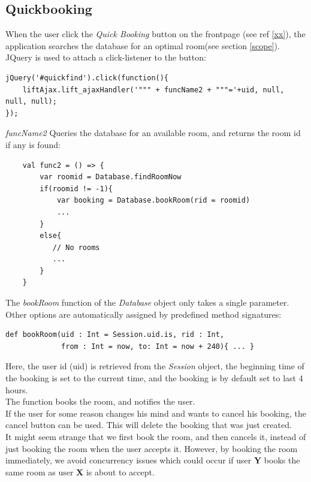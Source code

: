\subsection{Quickbooking}
\label{sub:quickbooking}
When the user click the \emph{Quick Booking} button on the frontpage (see ref \ref{xx}), the application searches the database for an optimal room(see section \ref{scope}).\\

JQuery is used to attach a click-listener to the button:

\begin{verbatim}
jQuery('#quickfind').click(function(){
    liftAjax.lift_ajaxHandler('""" + funcName2 + """='+uid, null, null, null);
});
\end{verbatim}

\emph{funcName2} Queries the database for an available room, and returns the room id if any is found:

\begin{verbatim}
    val func2 = () => {
        var roomid = Database.findRoomNow
        if(roomid != -1){
            var booking = Database.bookRoom(rid = roomid)
            ...
        }
        else{
           // No rooms
           ...
        }
    }
\end{verbatim}

The \emph{bookRoom} function of the \emph{Database} object only takes a single parameter. Other options are automatically assigned by predefined method signatures:

\begin{verbatim}
def bookRoom(uid : Int = Session.uid.is, rid : Int, 
             from : Int = now, to: Int = now + 240){ ... }
\end{verbatim}

Here, the user id (uid) is retrieved from the \emph{Session} object, the beginning time of the booking is set to the current time, and the booking is by default set to last 4 hours. \\
The function books the room, and notifies the user.\\

If the user for some reason changes his mind and wants to cancel his booking, the cancel button can be used. This will delete the booking that was just created. \\
It might seem strange that we first book the room, and then cancels it, instead of just booking the room when the user accepts it. However, by booking the room immediately, we avoid concurrency issues which could occur if user \textbf{Y} books the same room as user \textbf{X} is about to accept.

